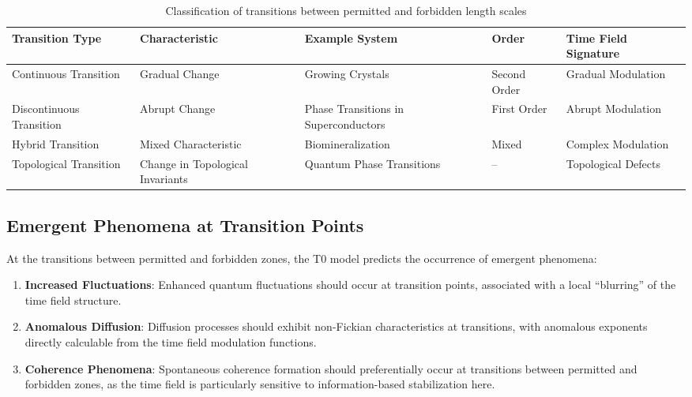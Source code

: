 \documentclass[12pt,a4paper]{article}
\begin{document}
	\begin{table}[h]
		\centering
		\begin{adjustbox}{scale=0.6}
			\begin{tabular}{lllll}
				\hline
				\textbf{Transition Type} & \textbf{Characteristic} & \textbf{Example System} & \textbf{Order} & \textbf{Time Field Signature} \\
				\hline
				Continuous Transition & Gradual Change & Growing Crystals & Second Order & Gradual Modulation \\
				Discontinuous Transition & Abrupt Change & Phase Transitions in Superconductors & First Order & Abrupt Modulation \\
				Hybrid Transition & Mixed Characteristic & Biomineralization & Mixed & Complex Modulation \\
				Topological Transition & Change in Topological Invariants & Quantum Phase Transitions & – & Topological Defects \\
				\hline
			\end{tabular}
		\end{adjustbox}
		\caption{Classification of transitions between permitted and forbidden length scales}
		\label{tab:transitions}
	\end{table}
	
	\subsection{Emergent Phenomena at Transition Points}
	
	At the transitions between permitted and forbidden zones, the T0 model predicts the occurrence of emergent phenomena:
	
	\begin{enumerate}
		\item \textbf{Increased Fluctuations}: Enhanced quantum fluctuations should occur at transition points, associated with a local ``blurring'' of the time field structure.
		
		\item \textbf{Anomalous Diffusion}: Diffusion processes should exhibit non-Fickian characteristics at transitions, with anomalous exponents directly calculable from the time field modulation functions.
		
		\item \textbf{Coherence Phenomena}: Spontaneous coherence formation should preferentially occur at transitions between permitted and forbidden zones, as the time field is particularly sensitive to information-based stabilization here.
	\end{enumerate}
	
\end{document}
